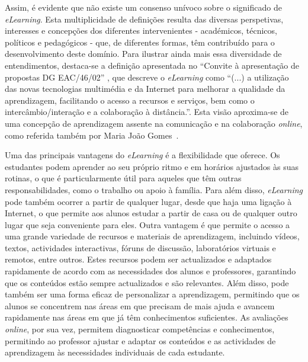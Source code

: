 Assim, é evidente que não existe um consenso unívoco sobre o significado de \textit{eLearning}. Esta multiplicidade de definições resulta das diversas perspetivas, interesses e concepções dos diferentes intervenientes - académicos, técnicos, políticos e pedagógicos - que, de diferentes formas, têm contribuído para o desenvolvimento deste domínio. Para ilustrar ainda mais essa diversidade de entendimentos, destaca-se a definição apresentada no ``Convite à apresentação de propostas DG EAC/46/02'' \cite{comissao197_07}, que descreve o \textit{eLearning} como ``(...) a utilização das novas tecnologias multimédia e da Internet para melhorar a qualidade da aprendizagem, facilitando o acesso a recursos e serviços, bem como o intercâmbio/interação e a colaboração à distância.''. Esta visão aproxima-se de uma concepção de aprendizagem assente na comunicação e na colaboração \textit{online}, como referida também por Maria João Gomes~\cite{gomes_e-learning_2005}.

Uma das principais vantagens do \textit{eLearning} é a flexibilidade que oferece. Os estudantes podem aprender ao seu próprio ritmo e em horários ajustados às suas rotinas, o que é particularmente útil para aqueles que têm outras responsabilidades, como o trabalho ou apoio à família. Para além disso, \textit{eLearning} pode também ocorrer a partir de qualquer lugar, desde que haja uma ligação à Internet, o que permite aos alunos estudar a partir de casa ou de qualquer outro lugar que seja conveniente para eles. Outra vantagem é que permite o acesso a uma grande variedade de recursos e materiais de aprendizagem, incluindo vídeos, textos, actividades interactivas, fóruns de discussão, laboratórios virtuais e remotos, entre outros. Estes recursos podem ser actualizados e adaptados rapidamente de acordo com as necessidades dos alunos e professores, garantindo que os conteúdos estão sempre actualizados e são relevantes. Além disso, pode também ser uma forma eficaz de personalizar a aprendizagem, permitindo que os alunos se concentrem nas áreas em que precisam de mais ajuda e avancem rapidamente nas áreas em que já têm conhecimentos suficientes. As avaliações \textit{online}, por sua vez, permitem diagnosticar competências e conhecimentos, permitindo ao professor ajustar e adaptar os conteúdos e as actividades de aprendizagem às necessidades individuais de cada estudante. 

